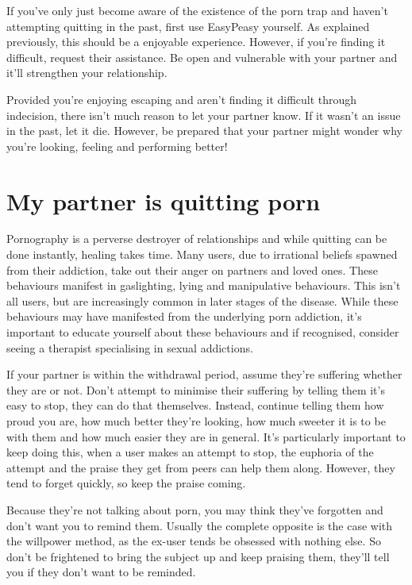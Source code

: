 \documentclass[easypeasy.tex]{subfiles}
\begin{document}
If you've only just become aware of the existence of the porn trap and haven't attempting quitting in the past, first use EasyPeasy yourself. As explained previously, this should be a enjoyable experience. However, if you're finding it difficult, request their assistance. Be open and vulnerable with your partner and it'll strengthen your relationship. 

Provided you're enjoying escaping and aren't finding it difficult through indecision, there isn't much reason to let your partner know. If it wasn't an issue in the past, let it die. However, be prepared that your partner might wonder why you're looking, feeling and performing better!

\section{My partner is quitting porn}

Pornography is a perverse destroyer of relationships and while quitting can be done instantly, healing takes time. Many users, due to irrational beliefs spawned from their addiction, take out their anger on partners and loved ones. These behaviours manifest in gaslighting, lying and manipulative behaviours. This isn't all users, but are increasingly common in later stages of the disease. While these behaviours may have manifested from the underlying porn addiction, it's important to educate yourself about these behaviours and if recognised, consider seeing a therapist specialising in sexual addictions.

If your partner is within the withdrawal period, assume they're suffering whether they are or not. Don't attempt to minimise their suffering by telling them it's easy to stop, they can do that themselves. Instead, continue telling them how proud you are, how much better they're looking, how much sweeter it is to be with them and how much easier they are in general. It's particularly important to keep doing this, when a user makes an attempt to stop, the euphoria of the attempt and the praise they get from peers can help them along. However, they tend to forget quickly, so keep the praise coming.

Because they're not talking about porn, you may think they've forgotten and don't want you to remind them. Usually the complete opposite is the case with the willpower method, as the ex-user tends be obsessed with nothing else. So don't be frightened to bring the subject up and keep praising them, they'll tell you if they don't want to be reminded.
\end{document}
